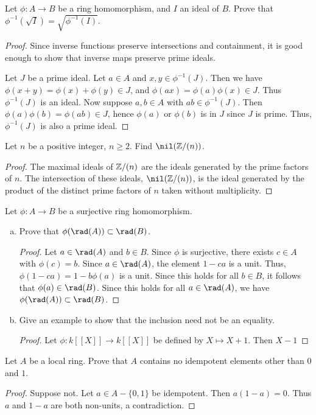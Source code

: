 \documentclass{article}
\begin{document}
 Let $\phi: A \to B$ be a ring homomorphism, and $I$ an ideal of $B$. Prove that $\phi^{-1}(\sqrt I) = \sqrt{\phi^{-1}(I)}$.

\begin{proof}

Since inverse functions preserve intersections and containment, it is good enough to show that inverse maps preserve prime ideals. 

Let $J$ be a prime ideal.  Let $a \in A$ and $x,y \in \phi^{-1}(J)$.  Then we have $\phi(x + y) = \phi(x) + \phi(y) \in J$, and $\phi(ax) = \phi(a)\phi(x) \in J$.  Thus $\phi^{-1}(J)$ is an ideal.   Now suppose $a,b \in A$ with $ab \in \phi^{-1}(J)$.  Then $\phi(a)\phi(b) = \phi(ab) \in J$,  hence $\phi(a)$ or $\phi(b)$ is in $J$ since $J$ is prime.  Thus, $\phi^{-1}(J)$ is also a prime ideal.
\end{proof}

 Let $n$ be a positive integer, $n \ge 2$. Find $\nil(\Z/(n))$.
\begin{proof}
The maximal ideals of $\mathbb{Z}/(n)$ are the ideals generated by the prime factors of $n$.  The intersection of these ideals, $\nil(\Z/(n))$,  is the ideal generated by the product of the distinct prime factors of $n$ taken without multiplicity.
\end{proof}

 Let $\phi: A \to B$ be a surjective ring homomorphism.
\begin{enumerate}[(a)]
\item Prove that $\phi(\rad(A)) \subset \rad(B)$.
\begin{proof}
Let $a \in \rad(A)$ and $b \in B$.  Since $\phi$ is surjective, there exists $c \in A$ with $\phi(c) = b$.  Since $a \in \rad(A)$, the element $1 - ca$ is a unit. Thus, $\phi(1 - ca) = 1 - b\phi(a)$ is a unit.  Since this holds for all $b \in B$, it follows that $\phi(a) \in \rad(B)$.  Since this holds for all $a \in \rad(A)$, we have $\phi(\rad(A)) \subset \rad(B)$.
\end{proof}
\item Give an example to show that the inclusion need not be an equality.
\begin{proof}
Let $\phi:k[[X]] \to k[[X]]$ be defined by $X \mapsto X+1$.  Then $X-1$
\end{proof}
\end{enumerate}

 Let $A$ be a local ring.  Prove that $A$ contains no idempotent elements other than $0$ and $1$.
\begin{proof}
Suppose not.  Let $a \in A - \{0,1\}$ be idempotent.  Then $a(1-a) = 0$.  Thus $a$ and $1-a$ are both non-units, a contradiction.
\end{proof}
\end{document}
